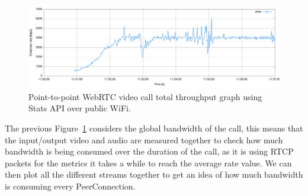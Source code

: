  \begin{figure}[h]
  \centering
    \includegraphics[width=1\textwidth]{./figures/onetooneWifiStatsRTC.pdf}
      \caption[Point-to-point WebRTC video call total throughput graph using Stats API over public WiFi]{Point-to-point WebRTC video call total throughput graph using Stats API over public WiFi.}
	\label{fig:onetooneWifiRTC}
\end{figure}

The previous Figure~\ref{fig:onetooneWifiRTC} considers the global bandwidth of the call, this means that the input/output video and audio are measured together to check how much bandwidth is being consumed over the duration of the call, as it is using RTCP packets for the metrics it takes a while to reach the average rate value. We can then plot all the different streams together to get an idea of how much bandwidth is consuming every PeerConnection.

%


